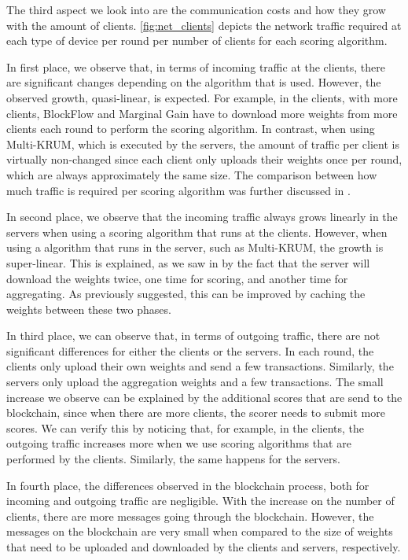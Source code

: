 The third aspect we look into are the communication costs and how they grow with the amount of clients. \autoref{fig:net_clients} depicts the network traffic required at each type of device per round per number of clients for each scoring algorithm.

In first place, we observe that, in terms of incoming traffic at the clients, there are significant changes depending on the algorithm that is used. However, the observed growth, quasi-linear, is expected. For example, in the clients, with more clients, BlockFlow and Marginal Gain have to download more weights from more clients each round to perform the scoring algorithm. In contrast, when using Multi-KRUM, which is executed by the servers, the amount of traffic per client is virtually non-changed since each client only uploads their weights once per round, which are always approximately the same size. The comparison between how much traffic is required per scoring algorithm was further discussed in .

In second place, we observe that the incoming traffic always grows linearly in the servers when using a scoring algorithm that runs at the clients. However, when using a algorithm that runs in the server, such as Multi-KRUM, the growth is super-linear. This is explained, as we saw in  by the fact that the server will download the weights twice, one time for scoring, and another time for aggregating. As previously suggested, this can be improved by caching the weights between these two phases.

In third place, we can observe that, in terms of outgoing traffic, there are not significant differences for either the clients or the servers. In each round, the clients only upload their own weights and send a few transactions. Similarly, the servers only upload the aggregation weights and a few transactions. The small increase we observe can be explained by the additional scores that are send to the blockchain, since when there are more clients, the scorer needs to submit more scores. We can verify this by noticing that, for example, in the clients, the outgoing traffic increases more when we use scoring algorithms that are performed by the clients. Similarly, the same happens for the servers.

In fourth place, the differences observed in the blockchain process, both for incoming and outgoing traffic are negligible. With the increase on the number of clients, there are more messages going through the blockchain. However, the messages on the blockchain are very small when compared to the size of weights that need to be uploaded and downloaded by the clients and servers, respectively. 

